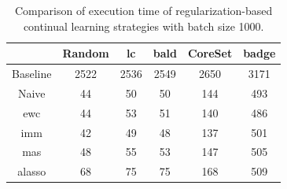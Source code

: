 \begin{table}[h]
    \centering
    \begin{tabular}{c | c c c c c } 
         & Random & \gls{lc} & \gls{bald} & CoreSet & \gls{badge}\\ 
        \hline 
        Baseline & 2522 & 2536 & 2549 & 2650 & 3171 \\
        \hline
        Naive & 44 & 50 & 50 & 144 & 493 \\
        \gls{ewc} & 44 & 53 & 51 & 140 & 486\\
        \gls{imm} & 42 & 49 & 48 & 137 & 501\\
        \gls{mas} & 48 & 55 & 53 & 147 & 505\\
        \gls{alasso} & 68 & 75 & 75 & 168 & 509\\
    \end{tabular}
    \caption{Comparison of execution time of regularization-based continual learning strategies
    with batch size 1000.}
    \label{fig:Appendix:CAL:1000bTimeTable}
\end{table}



